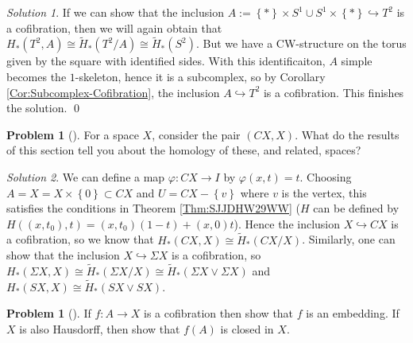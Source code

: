 \documentclass[reqno]{amsart}
\theoremstyle{definition}
\newtheorem{problem}[theorem]{Problem}
\theoremstyle{remark}
\newtheorem*{solution}{Solution}
\begin{document}
\begin{solution}
    If we can show that the inclusion
    $A:= \left\{ * \right\} \times S^{1} \cup 
    S^{1} \times \left\{ * \right\} \hookrightarrow
    T^2$ is a cofibration, then
    we will again obtain that
    $H_* (T^2, A) \cong
    \tilde{H}_* \left( T^2 / A \right) \cong
    \tilde{H}_* \left( S^2 \right) $.
    But we have a CW-structure on the
    torus given by the square with identified sides.
    With this identificaiton, $A$ simple becomes
    the $1$-skeleton, hence it is a subcomplex, so
    by Corollary \ref{Cor:Subcomplex-Cofibration}, 
    the inclusion $A \hookrightarrow T^2$ is a cofibration.
    This finishes the solution. \qed
\end{solution}

\begin{problem}[]
    For a space $X$, consider the pair
    $\left( CX, X \right) $. What do the results of this
    section tell you about the homology of these, and related,
    spaces?
\end{problem}


\begin{solution}
    We can define a map
    $\varphi \colon CX \to I$ by
    $\varphi (x,t) = t$. Choosing
    $A = X = X \times \left\{ 0 \right\} \subset 
    CX$ and
    $U = CX - \left\{ v \right\} $ where
    $v$ is the vertex, this satisfies the
    conditions in Theorem \ref{Thm:SJJDHW29WW} 
    ($H$ can be defined by
    $H((x,t_0),t) = \left( x,t_0 \right) (1-t)
    + (x,0) t$).
    Hence the inclusion
    $X \hookrightarrow CX$ is a cofibration, so we
    know that
    $H_* \left( CX, X \right) 
    \cong \tilde{H}_* \left( CX / X \right) $.
    Similarly, one can
    show that the inclusion
    $X \hookrightarrow \Sigma X$ is a cofibration, so
    $H_* \left( \Sigma X , X \right) 
    \cong \tilde{H}_* \left( \Sigma X / X \right) 
    \cong \tilde{H}_* \left( 
    \Sigma X \vee \Sigma X \right) $ and
    $H_*\left( SX, X \right) 
    \cong \tilde{H}_* \left( SX \vee SX \right) $.
\end{solution}


\begin{problem}[]
    If $f \colon A \to X$ is a cofibration then show that
    $f$ is an embedding. If $X$ is also Hausdorff,
    then show that $f(A)$ is closed in $X$.
\end{problem}
\end{document}
